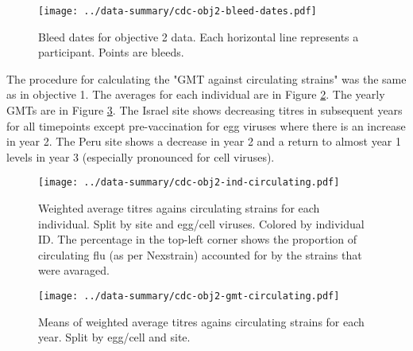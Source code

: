 \documentclass[12pt]{article}
\begin{document}
\begin{figure}
	\texttt{[image: ../data-summary/cdc-obj2-bleed-dates.pdf]}
	\caption{Bleed dates for objective 2 data. Each horizontal line represents a participant. Points are bleeds.}
	\label{fig:cdc-obj2-bleed-dates}
\end{figure}

The procedure for calculating the "GMT against circulating strains" was the same as in objective 1. The averages for each individual are in Figure \ref{fig:cdc-obj2-ind-circulating}. The yearly GMTs are in Figure \ref{fig:cdc-obj2-gmt-circulating}. The Israel site shows decreasing titres in subsequent years for all timepoints except pre-vaccination for egg viruses where there is an increase in year 2. The Peru site shows a decrease in year 2 and a return to almost year 1 levels in year 3 (especially pronounced for cell viruses).

\begin{figure}
	\texttt{[image: ../data-summary/cdc-obj2-ind-circulating.pdf]}
	\caption{Weighted average titres agains circulating strains for each individual. Split by site and egg/cell viruses. Colored by individual ID.  The percentage in the top-left corner shows the proportion of circulating flu (as per Nexstrain) accounted for by the strains that were avaraged.}
	\label{fig:cdc-obj2-ind-circulating}
\end{figure}

\begin{figure}
	\texttt{[image: ../data-summary/cdc-obj2-gmt-circulating.pdf]}
	\caption{Means of weighted average titres agains circulating strains for each year. Split by egg/cell and site.}
	\label{fig:cdc-obj2-gmt-circulating}
\end{figure}
\end{document}
